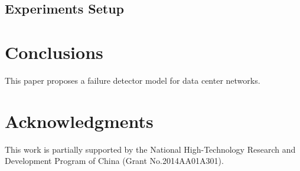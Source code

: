 \documentclass{sig-alternate-05-2015}
\begin{document}
\subsection{Experiments Setup}

\section{Conclusions}
This paper proposes a failure detector model for data center networks.


\section{Acknowledgments}
This work is partially supported by the National High-Technology Research and Development Program of China (Grant No.2014AA01A301).

%

%
%
\end{document}
